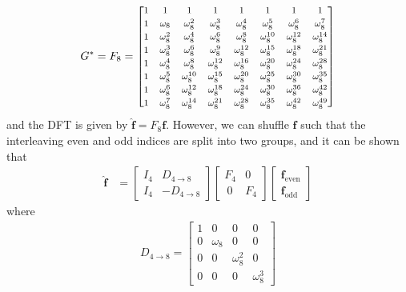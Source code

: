 \begin{align}
\renewcommand\arraystretch{1.25}
G^* = F_8 = 
\footnotesize
\begin{bmatrix}
1 & 1 & 1 & 1 & 1 & 1 & 1 & 1 \\
1 & \omega_8 & \omega_8^2 & \omega_8^3 & \omega_8^4 & \omega_8^5 & \omega_8^6 & \omega_8^7 \\
1 & \omega_8^2 & \omega_8^4 & \omega_8^6 & \omega_8^8 & \omega_8^{10} & \omega_8^{12} & \omega_8^{14} \\
1 & \omega_8^3 & \omega_8^6 & \omega_8^9 & \omega_8^{12} & \omega_8^{15} & \omega_8^{18} & \omega_8^{21} \\
1 & \omega_8^4 & \omega_8^8 & \omega_8^{12} & \omega_8^{16} & \omega_8^{20} & \omega_8^{24} & \omega_8^{28} \\
1 & \omega_8^5 & \omega_8^{10} & \omega_8^{15} & \omega_8^{20} & \omega_8^{25} & \omega_8^{30} & \omega_8^{35} \\
1 & \omega_8^6 & \omega_8^{12} & \omega_8^{18} & \omega_8^{24} & \omega_8^{30} & \omega_8^{36} & \omega_8^{42} \\
1 & \omega_8^7 & \omega_8^{14} & \omega_8^{21} & \omega_8^{28} & \omega_8^{35} & \omega_8^{42} & \omega_8^{49} 
\end{bmatrix}
\end{align}
and the DFT is given by $\hat{\textbf{f}} = F_8 \textbf{f}$. However, we can shuffle $\textbf{f}$ such that the interleaving even and odd indices are split into two groups, and it can be shown that
\begin{align}
\hat{\textbf{f}} &= 
\begin{bmatrix}
I_4 & D_{4 \to 8} \\
I_4 & -D_{4 \to 8}
\end{bmatrix}
\begin{bmatrix}
F_4 & 0 \\\
0 & F_4
\end{bmatrix}
\begin{bmatrix}
\textbf{f}_{\text{even}} \\
\textbf{f}_{\text{odd}}
\end{bmatrix}
\label{eqn:FFT48}
\end{align}
where
\begin{align}
D_{4 \to 8} = 
\begin{bmatrix}
1 & 0 & 0 & 0 \\
0 & \omega_8 & 0 & 0 \\
0 & 0 & \omega_8^2 & 0 \\
0 & 0 & 0 & \omega_8^3
\end{bmatrix}
\end{align}
